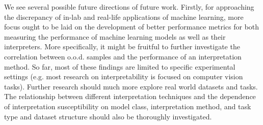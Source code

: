 









 \newline
We see several possible future directions of future work. Firstly, for approaching the discrepancy of in-lab and real-life applications of machine learning, more focus ought to be laid on the development of better performance metrics for both measuring the performance of machine learning models as well as their interpreters. 
More specifically, it might be fruitful to further investigate the correlation between o.o.d. samples and the performance of an interpretation method. So far, most of these findings are limited to specific experimental settings (e.g. most research on interpretability is focused on computer vision tasks).
Further research should much more explore real world datasets and tasks. The relationship between different interpretation techniques and the dependence of interpretation susceptibility on model class, interpretation method, and task type and dataset structure should also be thoroughly investigated. 


